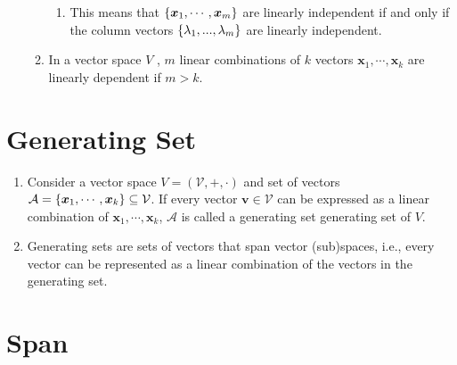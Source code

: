 \begin{enumerate}
\begin{enumerate}
\begin{enumerate}
            \item This means that $\left\{\bm{x}_1, \cdots , \bm{x}_m\right\}$ are linearly independent if and only if the column vectors $\left\{\lambda_1, . . . , \lambda_m\right\}$ are linearly independent.
            \hfill \cite{mfml/book/mml/Deisenroth-Faisal-Ong}
        \end{enumerate}

        \item In a vector space $V$ , $m$ linear combinations of $k$ vectors $\bm{x}_1, \cdots , \bm{x}_k$ are linearly dependent if $m > k$.
        \hfill \cite{mfml/book/mml/Deisenroth-Faisal-Ong}
    \end{enumerate}
\end{enumerate}





\section{Generating Set}

\begin{enumerate}
    \item 
    \begin{definition}
        Consider a vector space $V = (\mathcal{V}, +, \cdot)$ and set of vectors $\mathcal{A} = \left\{\bm{x}_1, \cdots , \bm{x}_k\right\} \subseteq \mathcal{V}$. 
        If every vector $\bm{v} \in \mathcal{V}$ can be expressed as a linear combination of $\bm{x}_1, \cdots , \bm{x}_k$, $\mathcal{A}$ is called a generating set generating set of $V$.
        \hfill \cite{mfml/book/mml/Deisenroth-Faisal-Ong}
    \end{definition}

    \item Generating sets are sets of vectors that span vector (sub)spaces, i.e., every vector can be represented as a linear combination of the vectors in the generating set.
    \hfill \cite{mfml/book/mml/Deisenroth-Faisal-Ong}
\end{enumerate}








\section{Span}


